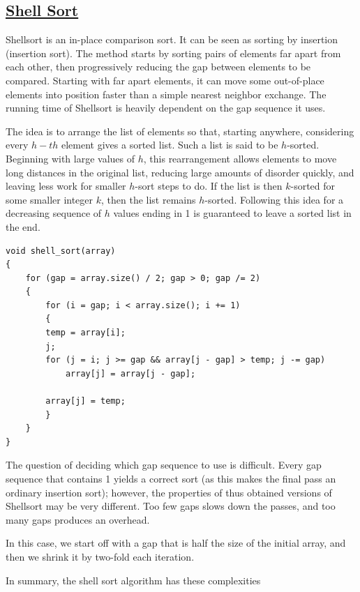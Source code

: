 \documentclass{article}
\begin{document}
\subsection{\underline{Shell Sort}}

Shellsort is an in-place comparison sort. It can be seen as sorting by insertion (insertion sort). The method starts by sorting pairs of elements far apart from each other, then progressively reducing the gap between elements to be compared. Starting with far apart elements, it can move some out-of-place elements into position faster than a simple nearest neighbor exchange. The running time of Shellsort is heavily dependent on the gap sequence it uses.

The idea is to arrange the list of elements so that, starting anywhere, considering every $h-th$ element gives a sorted list. Such a list is said to be $h$-sorted. Beginning with large values of $h$, this rearrangement allows elements to move long distances in the original list, reducing large amounts of disorder quickly, and leaving less work for smaller $h$-sort steps to do. If the list is then $k$-sorted for some smaller integer $k$, then the list remains $h$-sorted. Following this idea for a decreasing sequence of $h$ values ending in 1 is guaranteed to leave a sorted list in the end.

\begin{lstlisting}
void shell_sort(array)
{
	for (gap = array.size() / 2; gap > 0; gap /= 2)
	{
	    for (i = gap; i < array.size(); i += 1)
	    {
		temp = array[i];
		j;
		for (j = i; j >= gap && array[j - gap] > temp; j -= gap)
		    array[j] = array[j - gap];

		array[j] = temp;
	    }
	}
}
\end{lstlisting}

The question of deciding which gap sequence to use is difficult. Every gap sequence that contains 1 yields a correct sort (as this makes the final pass an ordinary insertion sort); however, the properties of thus obtained versions of Shellsort may be very different. Too few gaps slows down the passes, and too many gaps produces an overhead.

In this case, we start off with a gap that is half the size of the initial array, and then we shrink it by two-fold each iteration.

In summary, the shell sort algorithm has these complexities
\end{document}
